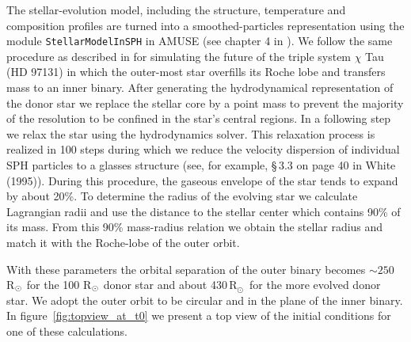 \documentclass[twocolumn]{aastex62}
\newcommand{\RSun}{\mbox{R$_\odot$}}
\begin{document}
The stellar-evolution model, including the structure, temperature and
composition profiles are turned into a smoothed-particles
representation using the module {\tt StellarModelInSPH} in AMUSE (see
chapter 4 in \cite{AMUSE}).  We follow the same procedure as described
in \cite{2014MNRAS.438.1909D} for simulating the future of the triple
system $\chi$ Tau (HD 97131) in which the outer-most star overfills
its Roche lobe and transfers mass to an inner binary.  After
generating the hydrodynamical representation of the donor star we
replace the stellar core by a point mass to prevent the majority of
the resolution to be confined in the star's central regions.  In a
following step we relax the star using the hydrodynamics solver. This
relaxation process is realized in 100 steps during which we reduce the
velocity dispersion of individual SPH particles to a glasses structure 
(see, for example, \S\,3.3 on page 40 in White (1995)).  During this procedure, the gaseous
envelope of the star tends to expand by about 20\%.  To determine the
radius of the evolving star we calculate Lagrangian radii and use the
distance to the stellar center which contains 90\% of its mass. From
this 90\% mass-radius relation we obtain the stellar radius and match
it with the Roche-lobe of the outer orbit.

With these parameters the orbital separation of the outer binary
becomes $\sim 250$ R$_{\rm \odot}$ for the 100 R$_{\rm \odot}$ donor star and about
430\,\RSun\, for the more evolved donor star.  We adopt the outer
orbit to be circular and in the plane of the inner binary.
In figure~\ref{fig:topview_at_t0} we present a top view of the initial
conditions for one of these calculations.
\end{document}
